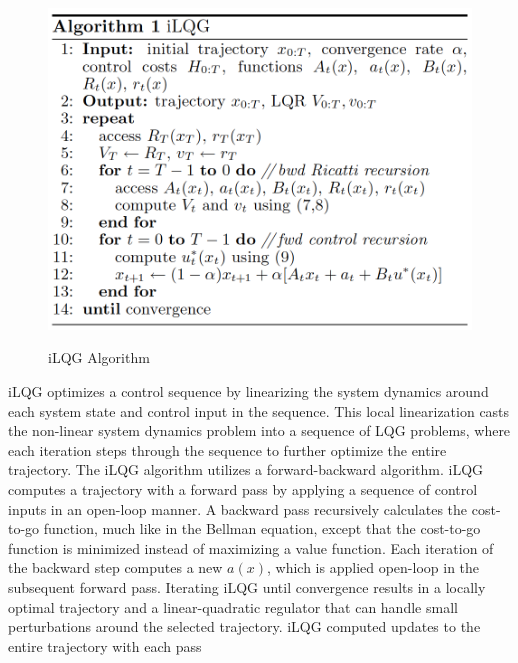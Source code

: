\documentclass[11pt]{article}
\begin{document}
            \begin{figure}
                \centering
                \includegraphics[width=0.45\linewidth]{images/algorithms/ilqg.png}
                \label{fig:ilqg}
                \caption{iLQG Algorithm \protect\cite{todorov_generalized_2005}}
            \end{figure}

            \par iLQG optimizes a control sequence by linearizing the system dynamics around each system state and control input in the sequence. This local linearization casts the non-linear system dynamics problem into a sequence of LQG problems, where each iteration steps through the sequence to further optimize the entire trajectory. The iLQG algorithm utilizes a forward-backward algorithm. iLQG computes a trajectory with a forward pass by applying a sequence of control inputs in an open-loop manner. A backward pass recursively calculates the cost-to-go function, much like in the Bellman equation, except that the cost-to-go function is minimized instead of maximizing a value function. Each iteration of the backward step computes a new $a(x)$, which is applied open-loop in the subsequent forward pass. Iterating iLQG until convergence results in a locally optimal trajectory and a linear-quadratic regulator that can handle small perturbations around the selected trajectory.\cite{todorov_generalized_2005} iLQG computed updates to the entire trajectory with each pass
\end{document}
